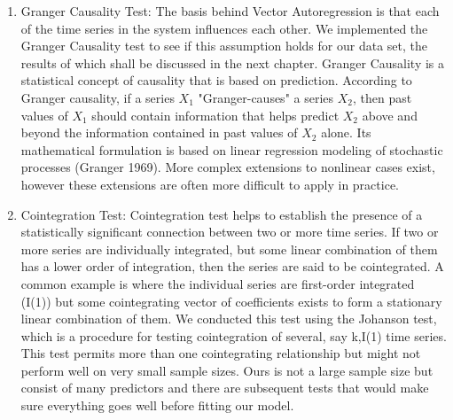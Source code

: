 \documentclass[12pt,italian, twoside]{report}
\begin{document}
\begin{enumerate}
\begin{itemize}
	\end{itemize}
       \begin{enumerate}   
	\item Granger Causality Test: The basis behind Vector Autoregression is that each of the time series in the system influences each other. We implemented the Granger Causality test to see if this assumption holds for our data set, the results of which shall be discussed in the next chapter. Granger Causality is a statistical concept of causality that is based on prediction. According to Granger causality, if a series \(X_1\) "Granger-causes" a series \(X_2\), then past values of \(X_1\) should contain information that helps predict \(X_2\) above and beyond the information contained in past values of \(X_2\) alone. Its mathematical formulation is based on linear regression modeling of stochastic processes (Granger 1969). More complex extensions to nonlinear cases exist, however these extensions are often more difficult to apply in practice.
	\item Cointegration Test: Cointegration test helps to establish the presence of a statistically significant connection between two or more time series. If two or more series are individually integrated, but some linear combination of them has a lower order of integration, then the series are said to be cointegrated. A common example is where the individual series are first-order integrated (I(1))  but some cointegrating vector of coefficients exists to form a stationary linear combination of them. We conducted this test using the Johanson test, which is a procedure for testing cointegration of several, say k,I(1) time series. This test permits more than one cointegrating relationship but might not perform well on very small sample sizes. Ours is not a large sample size but consist of many predictors and there are subsequent tests that would make sure everything goes well before fitting our model.

\end{enumerate}
\end{enumerate}
\end{document}
